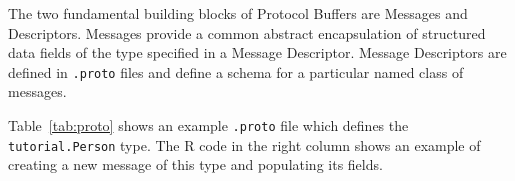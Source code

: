 \documentclass[article]{jss}
\begin{document}
The two fundamental building blocks of Protocol Buffers are Messages
and Descriptors.  Messages provide a common abstract encapsulation of
structured data fields of the type specified in a Message Descriptor.
Message Descriptors are defined in \texttt{.proto} files and define a
schema for a particular named class of messages.

Table~\ref{tab:proto} shows an example \texttt{.proto} file which
defines the \texttt{tutorial.Person} type.  The R code in the right
column shows an example of creating a new message of this type and
populating its fields.


\end{document}
